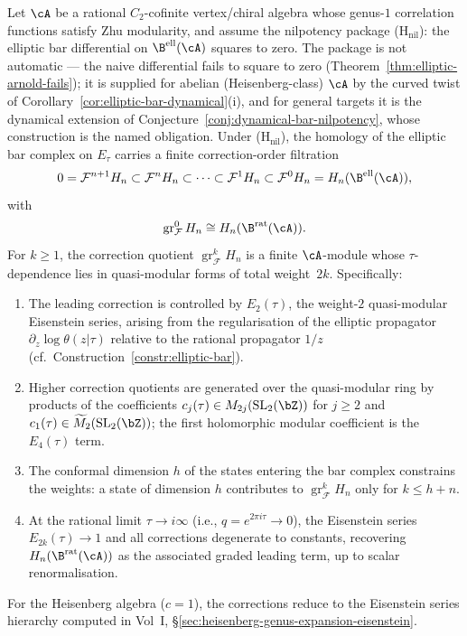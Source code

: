 \begin{theorem}\label{thm:elliptic-vs-rational}
Let $\cA$ be a rational $C_2$-cofinite vertex/chiral algebra whose
genus-$1$ correlation functions satisfy Zhu modularity, and assume
the nilpotency package \textup{(H$_{\mathrm{nil}}$)}: the elliptic
bar differential on $\B^{\mathrm{ell}}(\cA)$ squares to zero. The
package is not automatic --- the naive differential fails to square
to zero (Theorem~\ref{thm:elliptic-arnold-fails}); it is supplied
for abelian (Heisenberg-class) $\cA$ by the curved twist of
Corollary~\ref{cor:elliptic-bar-dynamical}(i), and for general
targets it is the dynamical extension of
Conjecture~\ref{conj:dynamical-bar-nilpotency}, whose construction
is the named obligation. Under \textup{(H$_{\mathrm{nil}}$)}, the
homology of the elliptic bar complex on $E_\tau$ carries a finite
correction-order filtration
\[
0 = \mathcal F^{n+1}H_n \subset \mathcal F^nH_n \subset \cdots
\subset \mathcal F^1H_n \subset \mathcal F^0H_n
= H_n(\B^{\mathrm{ell}}(\cA)),
\]
with
\[
\operatorname{gr}^0_{\mathcal F}H_n \cong H_n(\B^{\mathrm{rat}}(\cA)).
\]
For $k\geq 1$, the correction quotient
$\operatorname{gr}^k_{\mathcal F}H_n$ is a finite $\cA$-module whose
$\tau$-dependence lies in quasi-modular forms of total weight~$2k$.
Specifically:
\begin{enumerate}[label=(\roman*)]
\item The leading correction is controlled by $E_2(\tau)$, the
weight-$2$ quasi-modular Eisenstein series, arising from the
regularisation of
the elliptic propagator $\partial_z \log\theta(z|\tau)$
relative to the rational propagator $1/z$
(cf.\ Construction~\ref{constr:elliptic-bar}).
\item Higher correction quotients are generated over the
quasi-modular ring by products of the coefficients
$c_j(\tau)\in M_{2j}(\mathrm{SL}_2(\bZ))$ for $j\geq 2$ and
$c_1(\tau)\in\widetilde M_2(\mathrm{SL}_2(\bZ))$; the first
holomorphic modular coefficient is the $E_4(\tau)$ term.
\item The conformal dimension $h$ of the states entering the
bar complex constrains the weights: a state of dimension $h$
contributes to $\operatorname{gr}^k_{\mathcal F}H_n$ only for
$k \leq h+n$.
\item At the rational limit $\tau \to i\infty$ (i.e., $q = e^{2\pi i\tau} \to 0$),
the Eisenstein series $E_{2k}(\tau) \to 1$ and all corrections
degenerate to constants, recovering
$H_n(\B^{\mathrm{rat}}(\cA))$ as the associated graded leading term,
up to scalar renormalisation.
\end{enumerate}
For the Heisenberg algebra ($c = 1$), the corrections reduce to the
Eisenstein series hierarchy computed in
Vol~I, \S\ref{sec:heisenberg-genus-expansion-eisenstein}.
\end{theorem}

